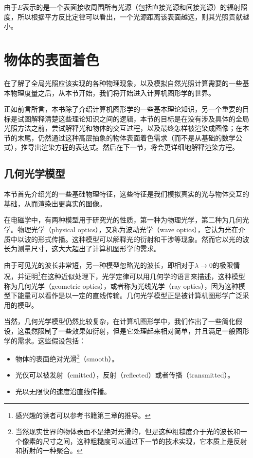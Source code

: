 由于$E$表示的是一个表面接收周围所有光源（包括直接光源和间接光源）的辐射照度，所以根据平方反比定律可以看出，一个光源距离该表面越远，则其光照贡献越小。









\section{物体的表面着色}
在了解了全局光照应该实现的各种物理现象，以及模拟自然光照计算需要的一些基本物理度量之后，从本节开始，我们将开始进入计算机图形学的世界。

正如前言所言，本书除了介绍计算机图形学的一些基本理论知识，另一个重要的目标是试图解释清楚这些理论知识之间的逻辑，本节的目标是在没有涉及具体的全局光照方法之前，尝试解释光和物体的交互过程，以及最终怎样被渲染成图像；在本节的末尾，仍然通过这种高层抽象的物体表面着色需求（而不是从基础的数学公式），推导出渲染方程的表达式。然后在下一节，将会更详细地解释渲染方程。




\subsection{几何光学模型} 
本节首先介绍光的一些基础物理特征，这些特征是我们模拟真实的光与物体交互的基础，从而渲染出更真实的图像。

在电磁学中，有两种模型用于研究光的性质，第一种为物理光学，第二种为几何光学。物理光学（physical optics），又称为波动光学（wave optics），它认为光在介质中以波的形式传播。这种模型可以解释光的衍射和干涉等现象。然而它以光的波长为测量尺寸，这大大超出了计算机图形学的需求。

由于可见光的波长非常短，另一种模型忽略光的波长，即相对于$\lambda\to 0$的极限情况，并证明\footnote{感兴趣的读者可以参考书籍\cite{b:PrinciplesofOptics}第三章的推导。}在这种近似处理下，光学定律可以用几何学的语言来描述，这种模型称为几何光学（geometric optics），或者称为光线光学（ray optics），因为这种模型下能量可以看作是以一定的直线传输。几何光学模型正是被计算机图形学广泛采用的模型。

当然，几何光学模型仍然比较复杂，在计算机图形学中，我们作出了一些简化假设，这虽然限制了一些效果如衍射，但是它处理起来相对简单，并且满足一般图形学的需求。这些假设包括：

\begin{itemize}
	\item 物体的表面绝对光滑\footnote{当然现实世界的物体表面不是绝对光滑的，但是这种粗糙度介于光的波长和一个像素的尺寸之间，这种粗糙度可以通过下一节的技术实现，它本质上是反射和折射的一种聚合。}（smooth）。
	\item 光仅可以被发射（emitted），反射（reflected）或者传播（transmitted）。
	\item 光以无限快的速度沿直线传播。
\end{itemize} 

